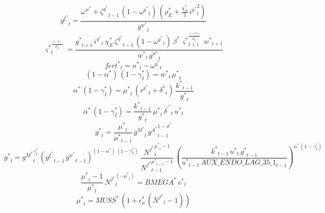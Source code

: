 \begin{dmath}
{{g^{\xi}^*}}_{t}=\frac{{{\omega^w^*}}+{{\zeta^y^*}}_{t-1}\, \left(1-{{\omega^y^*}}_{t}\right)\, \left({{\rho_E^*}}+\frac{{{\chi_E^*}}}{2}\, {{i^y^*}}_{t}^{2}\right)}{{{g^w^*}}_{t}}
\end{dmath}
\begin{dmath}
{{\varsigma^*}}_{t}^{\frac{\left(-1\right)}{{{\rho_U^*}}}}=\frac{{{g^*}}_{t+1}\, {{i^y^*}}_{t}\, {{\chi_E^*}}\, {{\zeta^y^*}}_{t-1}\, \left(1-{{\omega^y^*}}_{t}\right)\, {{\beta^*}}\, {{\varsigma^*}}_{t+1}^{\frac{\left(-1\right)}{{{\rho_U^*}}}}\, {{w^*}}_{t+1}}{{{w^*}}_{t}\, {{g^w^*}}_{t}}
\end{dmath}
\begin{dmath}
{{fert^*}}_{t}={{n^*}}_{t}-{{\omega^y^*}}_{t}
\end{dmath}
\begin{dmath}
\left(1-{{\alpha^*}}\right)\, \left(1-{{\gamma_I^*}}\right)={{w^*}}_{t}\, {{\mu^*}}_{t}
\end{dmath}
\begin{dmath}
{{\alpha^*}}\, \left(1-{{\gamma_I^*}}\right)={{\mu^*}}_{t}\, \left({{r^k^*}}_{t}+{{\delta^*}}_{t}\right)\, \frac{{{k^*}}_{t-1}}{{{g^*}}_{t}}
\end{dmath}
\begin{dmath}
{{\alpha^*}}\, \left(1-{{\gamma_I^*}}\right)=\frac{{{k^*}}_{t-1}}{{{g^*}}_{t}}\, {{\mu^*}}_{t}\, {{\delta^\prime^*}}_{t}\, {{u^*}}_{t}
\end{dmath}
\begin{dmath}
{{g^*}}_{t}=\frac{{{\mu^*}}_{t}}{{{\mu^*}}_{t-1}}\, {{g^M^*}}_{t}\, {{g^A^*}}_{t-1}^{1-{{\vartheta^*}}}
\end{dmath}
\begin{dmath}
{{g^*}}_{t}={{g^M^*}}_{t}^{{{\gamma_I^*}}}\, \left({{g^{\xi}^*}}_{t-1}\, {{g^w^*}}_{t-1}\right)^{\left(1-{{\alpha^*}}\right)\, \left(1-{{\gamma_I^*}}\right)}\, \frac{{{N^f^*}}_{t}^{{{\mu^*}}_{t}-1}}{{{N^f^*}}_{t-1}^{{{\mu^*}}_{t-1}-1}}\, \left(\frac{{{k^*}}_{t-1}\, {{u^*}}_{t}\, {{g^*}}_{t-1}}{{{u^*}}_{t-1}\, {AUX\_ENDO\_LAG\_35\_1}_{t-1}}\right)^{{{\alpha^*}}\, \left(1-{{\gamma_I^*}}\right)}
\end{dmath}
\begin{dmath}
\frac{{{\mu^*}}_{t}-1}{{{\mu^*}}_{t}}\, {{N^f^*}}_{t}^{\left(-{{\mu^*}}_{t}\right)}={{BMEGA^*}}\, {{v^*}}_{t}
\end{dmath}
\begin{dmath}
{{\mu^*}}_{t}={{MUSS^*}}\, \left(1+{{\epsilon_{\mu}^*}}\, \left({{N^f^*}}_{t}-1\right)\right)
\end{dmath}

